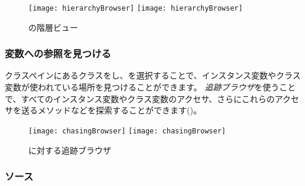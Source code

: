 \documentclass[a4paper,10pt,twoside]{book}
\begin{document}
\begin{figure}[btp]
\begin{center}
\ifluluelse
{\texttt{[image: hierarchyBrowser]}}
{\texttt{[image: hierarchyBrowser]}}
\end{center}
\caption{の階層ビュー}
\end{figure}

\subsubsection{変数への参照を見つける}

クラスペインにあるクラスを\actclick し、を選択することで、インスタンス変数やクラス変数が使われている場所を見つけることができます。
\emph{追跡ブラウザ}を使うことで、すべてのインスタンス変数やクラス変数のアクセサ、さらにこれらのアクセサを送るメソッドなどを探索することができます()。

\begin{figure}[btp]
\begin{center}
\ifluluelse
{\texttt{[image: chasingBrowser]}}
{\texttt{[image: chasingBrowser]}}
\end{center}
\caption{に対する追跡ブラウザ}
\end{figure}



\subsubsection{ソース}
\end{document}
